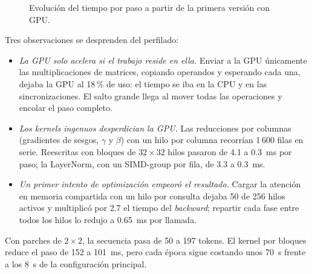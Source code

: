 \documentclass[11pt,a4paper]{article}
\begin{document}
\begin{figure}[H]
  \centering
  \caption{Evolución del tiempo por paso a partir de la primera versión con GPU.}
  \label{fig:rendimiento}
\end{figure}

Tres observaciones se desprenden del perfilado:

\begin{itemize}
  \item \emph{La GPU solo acelera si el trabajo reside en ella.} Enviar a la GPU
        únicamente las multiplicaciones de matrices, copiando operandos y
        esperando cada una, dejaba la GPU al 18\,\% de uso: el tiempo se iba en
        la CPU y en las sincronizaciones. El salto grande llega al mover todas
        las operaciones y encolar el paso completo.
  \item \emph{Los kernels ingenuos desperdician la GPU.} Las
        reducciones por columnas (gradientes de sesgos, $\gamma$ y $\beta$) con
        un hilo por columna recorrían 1\,600 filas en serie. Reescritas con
        bloques de $32\times32$ hilos pasaron de 4.1 a 0.3~ms por paso; la
        LayerNorm, con un SIMD-group por fila, de 3.3 a 0.3~ms.
  \item \emph{Un primer intento de optimización empeoró el resultado.} Cargar la
        atención en memoria compartida con un hilo por consulta dejaba 50 de
        256 hilos activos y multiplicó por 2.7 el tiempo del \emph{backward};
        repartir cada fase entre todos los hilos lo redujo a 0.65~ms por
        llamada.
\end{itemize}

Con parches de $2\times2$, la secuencia pasa de 50 a 197 tokens. El kernel por
bloques reduce el paso de 152 a 101~ms, pero cada época sigue costando unos
70~s frente a los 8~s de la configuración principal.
\end{document}

